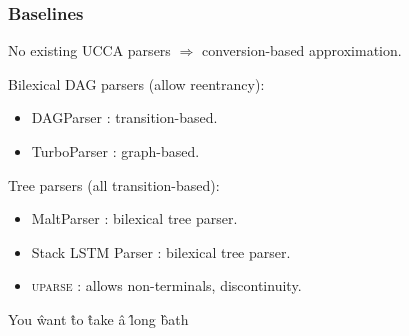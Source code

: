\documentclass[t]{beamer}
\begin{document}
\begin{frame}
\frametitle{Baselines}
No existing UCCA parsers $\Rightarrow$ conversion-based approximation.

\vfill
\footnotesize
Bilexical DAG parsers (allow {\color{orange}reentrancy}):
\begin{itemize}
 \item DAGParser \cite{ribeyre-villemontedelaclergerie-seddah:2014:SemEval}:
 transition-based.
 \item TurboParser \cite{almeida-martins:2015:SemEval}:
 graph-based.
\end{itemize}

Tree parsers (all transition-based):
\begin{itemize}
 \item MaltParser \cite{nivre2007maltparser}: bilexical tree parser.
 \item Stack LSTM Parser \cite{dyer2015transition}: bilexical tree parser.
 \item \textsc{uparse} \cite{maier2015discontinuous}: allows {\color{blue}non-terminals}, {\color{red}discontinuity}.
\end{itemize}

\vfill
\begin{center}
	\begin{dependency}
	\begin{deptext}[column sep=1.5em,ampersand replacement=\^,font=\rmfamily]
	You \^ want \^ to \^ take \^ a \^ long \^ bath \\
	\end{deptext}
	\end{dependency}
\end{center}
\end{frame}
\end{document}
